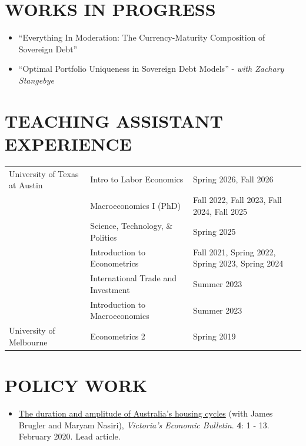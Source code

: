 \documentclass[letterpaper,11pt]{article}
\begin{document}
\section{\textbf{WORKS IN PROGRESS}}
\begin{itemize}
  \item ``Everything In Moderation: The Currency-Maturity Composition of Sovereign Debt''
  \item ``Optimal Portfolio Uniqueness in Sovereign Debt Models'' - \textit{with Zachary Stangebye}\\
\end{itemize}


\section{\textbf{TEACHING ASSISTANT EXPERIENCE}}
\noindent
\begin{tabular}{@{}p{} p{} p{}@{}}
University of Texas at Austin
  & Intro to Labor Economics & Spring 2026, Fall 2026\\[0.8em]
  & Macroeconomics I (PhD) &  Fall 2022, Fall 2023, Fall 2024, Fall 2025 \\[0.8em]
  & Science, Technology, \& Politics  & Spring 2025 \\[0.8em]
  & Introduction to Econometrics  & Fall 2021, Spring 2022, Spring 2023, Spring 2024 \\[0.8em]
  & International Trade and Investment & Summer 2023 \\[0.8em]
  & Introduction to Macroeconomics & Summer 2023\\[1.5em]
University of Melbourne
  & Econometrics 2 & Spring 2019 \\
\end{tabular}


\section{\textbf{POLICY WORK}}
\begin{itemize}
  \item \href{https://www.dtf.vic.gov.au/victorias-economic-bulletin-volume-4}{The duration and amplitude of Australia's housing cycles} (with James Brugler and Maryam Nasiri), \textit{Victoria's Economic Bulletin}. \textbf{4}: 1 - 13. February 2020. Lead article.
\end{itemize}
\end{document}
